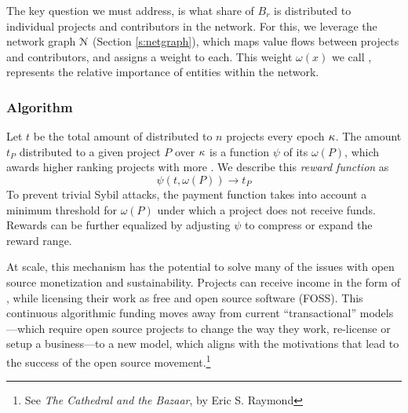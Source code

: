 The key question we must address, is what share of $B_r$ is distributed to
individual projects and contributors in the network.
For this, we leverage the \oscoin{} network graph $\mathcal{N}$ (Section
\ref{s:netgraph}), which maps value flows between projects and contributors,
and assigns a weight to each. This weight $\omega(x)$ we call \osrank{}, represents
the relative importance of entities within the network.

\subsubsection{Algorithm} Let $t$ be the total amount of \oscoin{} distributed
to $n$ projects every epoch $\kappa$. The amount $t_P$ distributed to a given
project $P$ over $\kappa$ is a function $\psi$ of its \osrank{} $\omega(P)$,
which awards higher ranking projects with more \oscoin{}. We describe this
\emph{reward function} as
\[
    \psi(t, \omega(P)) \to t_P
\]
To prevent trivial Sybil attacks, the payment function takes
into account a minimum threshold for $\omega(P)$ under which a project does not
receive funds. Rewards can be further equalized by adjusting $\psi$ to
compress or expand the reward range.

At scale, this mechanism has the potential to solve many of the issues with
open source monetization and sustainability. Projects can receive
income in the form of \oscoin{}, while licensing their work as free and
open source software (FOSS). This continuous algorithmic funding moves
away from current ``transactional'' models---which require open source projects
to change the way they work, re-license or setup a business---to a new model,
which aligns with the motivations that lead to the success of the open source
movement.\footnote{See \emph{The Cathedral and the Bazaar}, by Eric S. Raymond}

